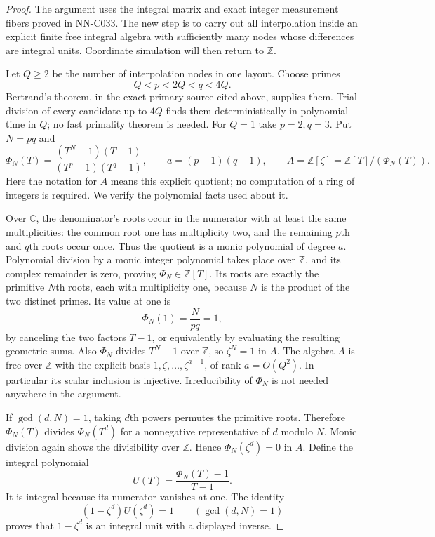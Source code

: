 \begin{proof}
The argument uses the integral matrix and exact integer measurement fibers proved in NN-C033. The new step is to carry out all interpolation inside an explicit finite free integral algebra with sufficiently many nodes whose differences are integral units. Coordinate simulation will then return to $\mathbb Z$.

Let $Q\geq2$ be the number of interpolation nodes in one layout. Choose primes
\[
                   Q<p<2Q<q<4Q.
\]
Bertrand's theorem, in the exact primary source cited above, supplies them. Trial division of every candidate up to $4Q$ finds them deterministically in polynomial time in $Q$; no fast primality theorem is needed. For $Q=1$ take $p=2,q=3$. Put $N=pq$ and
\[
 \Phi_N(T)=\frac{(T^N-1)(T-1)}{(T^p-1)(T^q-1)},\qquad
 a=(p-1)(q-1),\qquad A=\mathbb Z[\zeta]=\mathbb Z[T]/(\Phi_N(T)).
\]
Here the notation for $A$ means this explicit quotient; no computation of a ring of integers is required. We verify the polynomial facts used about it.

Over $\mathbb C$, the denominator's roots occur in the numerator with at least the same multiplicities: the common root one has multiplicity two, and the remaining $p$th and $q$th roots occur once. Thus the quotient is a monic polynomial of degree $a$. Polynomial division by a monic integer polynomial takes place over $\mathbb Z$, and its complex remainder is zero, proving $\Phi_N\in\mathbb Z[T]$. Its roots are exactly the primitive $N$th roots, each with multiplicity one, because $N$ is the product of the two distinct primes. Its value at one is
\[
                    \Phi_N(1)=\frac{N}{pq}=1,
\]
by canceling the two factors $T-1$, or equivalently by evaluating the resulting geometric sums. Also $\Phi_N$ divides $T^N-1$ over $\mathbb Z$, so $\zeta^N=1$ in $A$. The algebra $A$ is free over $\mathbb Z$ with the explicit basis
$1,\zeta,\ldots,\zeta^{a-1}$, of rank $a=O(Q^2)$. In particular its scalar inclusion is injective. Irreducibility of $\Phi_N$ is not needed anywhere in the argument.

If $\gcd(d,N)=1$, taking $d$th powers permutes the primitive roots. Therefore $\Phi_N(T)$ divides $\Phi_N(T^d)$ for a nonnegative representative of $d$ modulo $N$. Monic division again shows the divisibility over $\mathbb Z$. Hence $\Phi_N(\zeta^d)=0$ in $A$. Define the integral polynomial
\[
                     U(T)=\frac{\Phi_N(T)-1}{T-1}.
\]
It is integral because its numerator vanishes at one. The identity
\[
                   (1-\zeta^d)U(\zeta^d)=1
                 \qquad(\gcd(d,N)=1)
\]
proves that $1-\zeta^d$ is an integral unit with a displayed inverse.


\end{proof}
